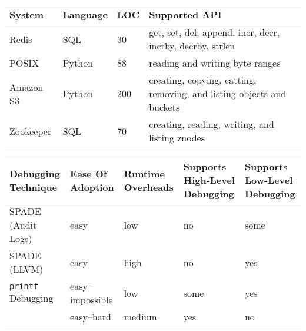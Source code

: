 \begin{center}
  \small

  \begin{tabular}{lllp{8.5in}}
    \toprule
    System    & Language & LOC & Supported API                                                         \\\midrule
    Redis     & SQL      & 30  & get, set, del, append, incr, decr, incrby, decrby, strlen             \\
    POSIX     & Python   & 88  & reading and writing byte ranges                                       \\
    Amazon S3 & Python   & 200 & creating, copying, catting, removing, and listing objects and buckets \\
    Zookeeper & SQL      & 70  & creating, reading, writing, and listing znodes                        \\
    \bottomrule
  \end{tabular}
\end{center}

\begin{center}
  \small

  \begin{tabular}{lp{3in}p{2in}p{2in}p{2in}}
    \toprule
    Debugging Technique       & Ease Of Adoption & Runtime Overheads & Supports High-Level Debugging & Supports Low-Level Debugging \\\midrule
    SPADE (Audit Logs)        & easy             & low               & no                            & some \\
    SPADE (LLVM)              & easy             & high              & no                            & yes \\
    \texttt{printf} Debugging & easy--impossible & low               & some                          & yes \\
    \fluent{}                 & easy--hard       & medium            & yes                           & no \\
    \bottomrule
  \end{tabular}
\end{center}
